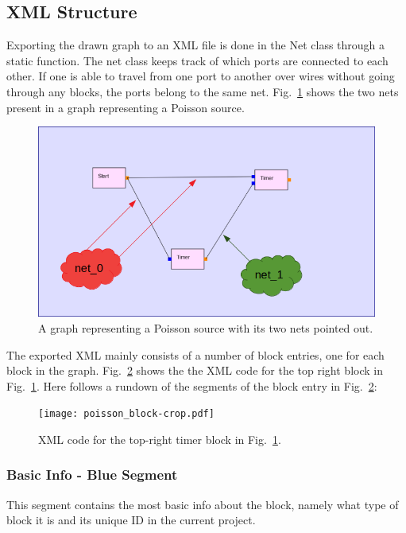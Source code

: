 \documentclass[journal,comsoc]{IEEEtran}
\begin{document}
\subsection{XML Structure}
\label{sec:xml}
Exporting the drawn graph to an XML file is done in the Net class through a static function.
The net class keeps track of which ports are connected to each other. If one is able to
travel from one port to another over wires without going through any blocks, the ports
belong to the same net. Fig.~\ref{fig:net} shows the two nets present in a graph representing
a Poisson source.

\begin{figure}[!t]
    \centering
    \includegraphics[width=\columnwidth]{poisson_nets.png}
    \caption{A graph representing a Poisson source with its two nets pointed out.}
    \label{fig:net}
\end{figure}

The exported XML mainly consists of a number of block entries, one for each block in the graph.
Fig.~\ref{fig:xml} shows the the XML code for the top right block in Fig.~\ref{fig:net}. Here
follows a rundown of the segments of the block entry in Fig.~\ref{fig:xml}:
\begin{figure}[!t]
    \centering
    \texttt{[image: poisson\_block-crop.pdf]}
    \caption{XML code for the top-right timer block in Fig.~\ref{fig:net}.}
    \label{fig:xml}
\end{figure}

\subsubsection{Basic Info - Blue Segment}
This segment contains the most basic info about the block, namely
what type of block it is and its unique ID in the current project.
\end{document}
